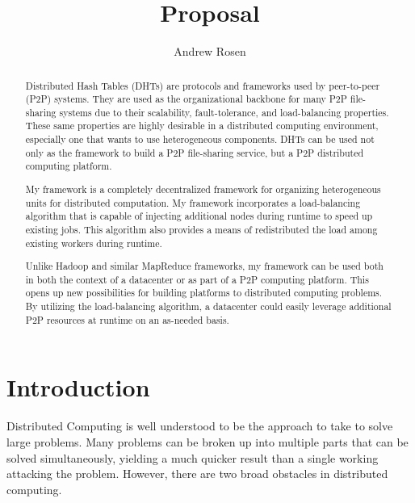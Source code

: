 \documentclass[10pt,letterpaper,twoside]{report}
\title{Proposal}
\author{Andrew Rosen}
\begin{document}
\maketitle
\setcounter{tocdepth}{4}
\tableofcontents
\newpage

\begin{abstract}
Distributed Hash Tables (DHTs) are protocols and frameworks used by peer-to-peer (P2P) systems.
They are used as the organizational backbone for many P2P file-sharing systems due to their scalability, fault-tolerance, and load-balancing properties.
These same properties are highly desirable in a distributed computing environment, especially one that wants to use heterogeneous components.
DHTs can be used not only as the framework to build a P2P file-sharing service, but a P2P distributed computing platform.

My framework is a completely decentralized framework for organizing heterogeneous units for distributed computation.
My framework incorporates a load-balancing algorithm that is capable of injecting additional nodes during runtime to speed up existing jobs.
This algorithm also provides a means of redistributed the load among existing workers during runtime.

Unlike Hadoop and similar MapReduce frameworks, my framework can be used both in both the context of a datacenter or as part of a P2P computing platform.  
This opens up new possibilities for building platforms to distributed computing problems.
By utilizing the load-balancing algorithm, a datacenter could  easily leverage additional P2P resources at runtime on an as-needed basis.

\end{abstract}

\chapter{Introduction}


Distributed Computing is well understood to be the approach to take to solve large problems.  
Many problems can be broken up into multiple parts that can be solved simultaneously, yielding a much quicker result than a single working attacking the problem.
However, there are two broad obstacles in distributed computing.
\end{document}

